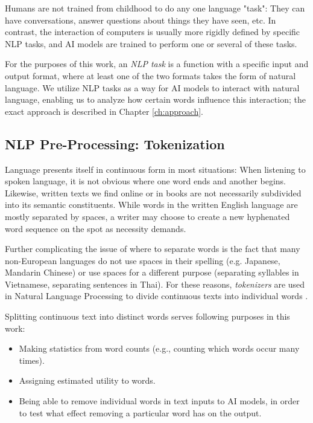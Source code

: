 Humans are not trained from childhood to do any one language "task":
They can have conversations, answer questions about things they have seen, etc.
In contrast, the interaction of computers is usually more rigidly defined by specific NLP tasks, and AI models are trained to perform one or several of these tasks.

For the purposes of this work, an \textit{NLP task} is a function with a specific input and output format, where at least one of the two formats takes the form of natural language.
We utilize NLP tasks as a way for AI models to interact with natural language, enabling us to analyze how certain words influence this interaction; the exact approach is described in Chapter \ref{ch:approach}.


\subsection{NLP Pre-Processing: Tokenization} \label{sec:tokenization}
Language presents itself in continuous form in most situations:
When listening to spoken language, it is not obvious where one word ends and another begins.
Likewise, written texts we find online or in books are not necessarily subdivided into its semantic constituents.
While words in the written English language are mostly separated by spaces, a writer may choose to create a new hyphenated word sequence on the spot as necessity demands.

Further complicating the issue of where to separate words is the fact that many non-European languages do not use spaces in their spelling (e.g. Japanese, Mandarin Chinese) or use spaces for a different purpose (separating syllables in Vietnamese, separating sentences in Thai).
For these reasons, \textit{tokenizers} are used in Natural Language Processing to divide continuous texts into individual words \cite{jurafskySpeechLanguageProcessing2025}.


Splitting continuous text into distinct words serves following purposes in this work:
\begin{itemize}
	\item Making statistics from word counts (e.g., counting which words occur many times).
	\item Assigning estimated utility to words.
	\item Being able to remove individual words in text inputs to AI models, in order to test what effect removing a particular word has on the output.
\end{itemize}

